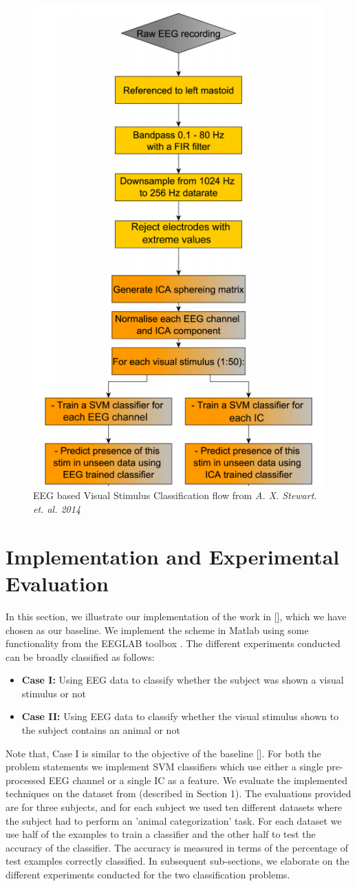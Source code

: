\documentclass{article} %
\begin{document}
\begin{figure}
	\centering
	\includegraphics[width=0.5\columnwidth]{flowchart}
	\caption{EEG based Visual Stimulus Classification flow from \textit{A. X. Stewart. et. al. 2014}}
	\label{fig:flowchart}
\end{figure}

\section{Implementation and Experimental Evaluation}
In this section, we illustrate our implementation of the work in [], which we have chosen as our baseline. We implement the scheme in Matlab using some functionality from the EEGLAB toolbox \cite{eeglab}. The different experiments conducted can be broadly classified as follows:

\begin{itemize}
	\item \textbf{Case I:} Using EEG data to classify whether the subject was shown a visual stimulus or not 
	\item \textbf{Case II:} Using EEG data to classify whether the visual stimulus shown to the subject contains an animal or not 
\end{itemize}

Note that, Case I is similar to the objective of the baseline []. For both the problem statements we implement SVM classifiers which use either a single pre-processed EEG channel or a single IC as a feature. We evaluate the implemented techniques on the dataset from \cite{data} (described in Section 1). The evaluations provided are for three subjects, and for each subject we used ten different datasets where the subject had to perform an 'animal categorization' task. For each dataset we use half of the examples to train a classifier and the other half to test the accuracy of the classifier. The accuracy is measured in terms of the percentage of test examples correctly classified. In subsequent sub-sections, we elaborate on the different experiments conducted for the two classification problems.
\end{document}

